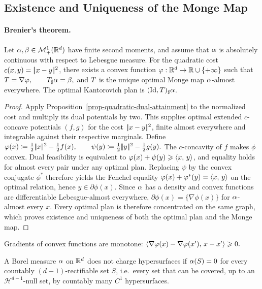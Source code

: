 \subsection{Existence and Uniqueness of the Monge Map}
\label{sec-monge-existence-uniqueness}
\paragraph{Brenier's theorem.}
\begin{thm}[Brenier]\label{thm-brenier}
Let $\alpha,\beta\in\mathcal{M}_+^1(\mathbb{R}^d)$ have finite second moments, and assume that $\alpha$ is absolutely continuous with respect to Lebesgue measure. For the quadratic cost $c(x,y)=|\!| x-y |\!|^2$, there exists a convex function $\varphi:\mathbb{R}^d\to\mathbb{R}\cup\{+\infty\}$ such that
\(T=\nabla\varphi, \qquad T_\sharp\alpha=\beta,\)
and $T$ is the unique optimal Monge map $\alpha$-almost everywhere. The optimal Kantorovich plan is $(\mathrm{Id},T)_\sharp\alpha$.
\end{thm}
\begin{proof}
Apply Proposition~\ref{prop-quadratic-dual-attainment} to the normalized cost and multiply its dual potentials by two. This supplies optimal extended $c$-concave potentials $(f,g)$ for the cost $|\!| x-y |\!|^2$, finite almost everywhere and integrable against their respective marginals. Define
\(\varphi(x)\coloneqq\frac12|\!| x |\!|^2-\frac12 f(x), \qquad \psi(y)\coloneqq\frac12|\!| y |\!|^2-\frac12 g(y).\)
The $c$-concavity of $f$ makes $\phi$ convex. Dual feasibility is equivalent to $\varphi(x)+\psi(y)\geqslant\langle x,\,y\rangle$, and equality holds for almost every pair under any optimal plan. Replacing $\psi$ by the convex conjugate $\phi^*$ therefore yields the Fenchel equality $\varphi(x)+\varphi^*(y)=\langle x,\,y\rangle$ on the optimal relation, hence $y\in\partial\phi(x)$. Since $\alpha$ has a density and convex functions are differentiable Lebesgue-almost everywhere, $\partial\phi(x)=\{\nabla\phi(x)\}$ for $\alpha$-almost every $x$. Every optimal plan is therefore concentrated on the same graph, which proves existence and uniqueness of both the optimal plan and the Monge map.
\end{proof}
Gradients of convex functions are monotone: \(\langle \nabla\varphi(x)-\nabla\varphi(x'),\,x-x'\rangle\geqslant0.\)
\begin{defn}\label{defn-not-charging-hypersurfaces}
A Borel measure $\alpha$ on $\mathbb{R}^d$ does not charge hypersurfaces if $\alpha(S)=0$ for every countably $(d-1)$-rectifiable set $S$, i.e.\ every set that can be covered, up to an $\mathcal H^{d-1}$-null set, by countably many $C^1$ hypersurfaces.
\end{defn}
